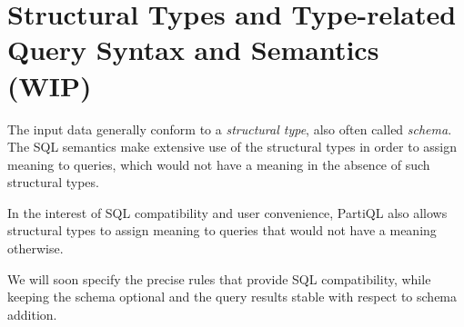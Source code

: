 \section{Structural Types and Type-related Query Syntax and Semantics (WIP)}
\label{sec:schema}
The input data generally conform to a \textit{structural type}, also often
called \textit{schema}. The SQL semantics make extensive use of the structural
types in order to assign meaning to queries, which would not have a meaning in
the absence of such structural types.


In the interest of SQL compatibility and user convenience, PartiQL also allows
structural types to assign meaning to queries that would not have a meaning
otherwise.

We will soon specify the precise rules that provide SQL compatibility, 
while keeping the schema optional and the query results stable with respect to schema addition.

